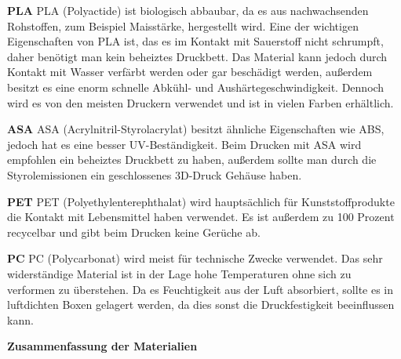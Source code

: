 \textbf{PLA}
PLA (Polyactide) ist biologisch abbaubar, da es aus nachwachsenden Rohstoffen, zum Beispiel Maisstärke, hergestellt wird.
Eine der wichtigen Eigenschaften von PLA ist, das es im Kontakt mit Sauerstoff nicht schrumpft, daher benötigt man kein beheiztes
Druckbett. Das Material kann jedoch durch Kontakt mit Wasser verfärbt werden oder gar beschädigt werden, außerdem besitzt
es eine enorm schnelle Abkühl- und Aushärtegeschwindigkeit. Dennoch wird es von den meisten Druckern verwendet und ist
in vielen Farben erhältlich.

\textbf{ASA}
ASA (Acrylnitril-Styrolacrylat) besitzt ähnliche Eigenschaften wie ABS, jedoch hat es eine besser UV-Beständigkeit.
Beim Drucken mit ASA wird empfohlen ein beheiztes Druckbett zu haben, außerdem sollte man durch die Styrolemissionen
ein geschlossenes 3D-Druck Gehäuse haben.

\textbf{PET}
PET (Polyethylenterephthalat) wird hauptsächlich für Kunststoffprodukte die Kontakt mit Lebensmittel haben verwendet.
Es ist außerdem zu 100 Prozent recycelbar und gibt beim Drucken keine Gerüche ab.

\textbf{PC}
PC (Polycarbonat) wird meist für technische Zwecke verwendet. Das sehr widerständige Material ist in der Lage hohe
Temperaturen ohne sich zu verformen zu überstehen. Da es Feuchtigkeit aus der Luft absorbiert, sollte es in luftdichten
Boxen gelagert werden, da dies sonst die Druckfestigkeit beeinflussen kann.

\textbf{Zusammenfassung der Materialien}

\begin{table}[H]
    \centering
    \caption{Vergleich der 3D-Druck Materialien}
\end{table}

